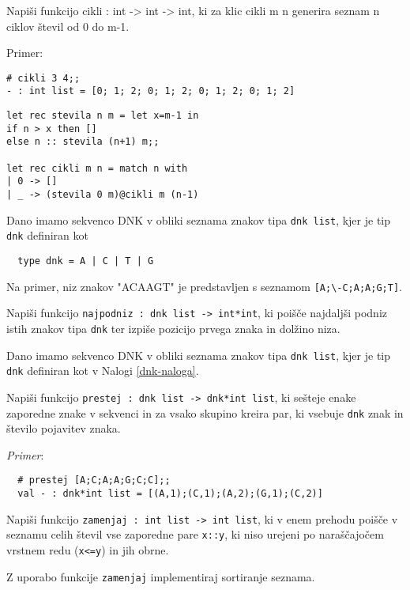 \begin{ex}
  Napi\v si funkcijo cikli : int -> int -> int, ki za klic cikli m n
  generira seznam n ciklov \v stevil od 0 do m-1.

\noindent\/Primer:
\begin{lstlisting}
# cikli 3 4;; 
- : int list = [0; 1; 2; 0; 1; 2; 0; 1; 2; 0; 1; 2]
\end{lstlisting}

\begin{sol}
\begin{lstlisting}
let rec stevila n m = let x=m-1 in
if n > x then []
else n :: stevila (n+1) m;;

let rec cikli m n = match n with
| 0 -> []
| _ -> (stevila 0 m)@cikli m (n-1)
\end{lstlisting}
\end{sol}

\end{ex} 
\begin{ex}
  \label{dnk-naloga}
  Dano imamo sekvenco DNK v obliki seznama znakov tipa \lstinline{dnk list},
  kjer je tip \lstinline{dnk} definiran kot

  \begin{lstlisting}
  type dnk = A | C | T | G
  \end{lstlisting}
  Na primer, niz znakov "ACAAGT"  je predstavljen s seznamom 
  \lstinline{[A;\-C;A;A;G;T]}. 

  Napi\v si funkcijo \lstinline{najpodniz : dnk list -> int*int}, ki
  poi\v s\v ce najdalj\v si podniz istih znakov tipa \lstinline{dnk} ter
  izpi\v se pozicijo prvega znaka in dol\v zino niza.


\end{ex} 
\begin{ex}
  Dano imamo sekvenco DNK v obliki seznama znakov tipa \lstinline{dnk list},
  kjer je tip \lstinline{dnk} definiran kot v Nalogi \ref{dnk-naloga}.

  Napi\v si funkcijo \lstinline{prestej : dnk list -> dnk*int list}, ki
  se\v steje enake zaporedne znake v sekvenci in za vsako skupino
  kreira par, ki vsebuje \lstinline{dnk} znak in \v stevilo pojavitev
  znaka.

  \emph{Primer}: 
  \begin{lstlisting}
  # prestej [A;C;A;A;G;C;C];;
  val - : dnk*int list = [(A,1);(C,1);(A,2);(G,1);(C,2)]
  \end{lstlisting}


\end{ex} 
\begin{ex}
  Napi\v si funkcijo \lstinline{zamenjaj : int list -> int list}, ki v
  enem prehodu poi\v s\v ce v seznamu celih \v stevil vse zaporedne
  pare \lstinline{x::y}, ki niso urejeni po nara\v s\v cajo\v cem vrstnem
  redu (\lstinline{x<=y}) in jih obrne.

  Z uporabo funkcije \lstinline{zamenjaj} implementiraj sortiranje seznama.


\end{ex} 
